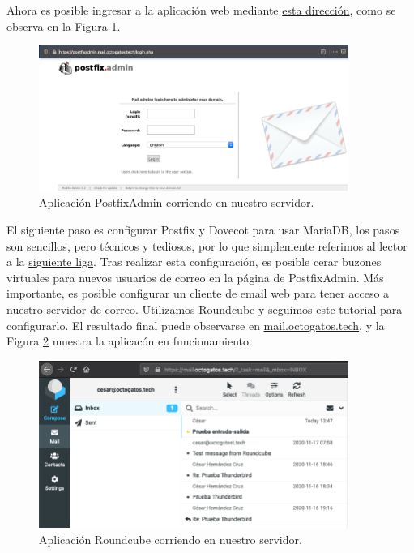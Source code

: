 \documentclass{article}
\begin{document}
Ahora es posible ingresar a la aplicaci\'on web
mediante
\href{https://postfixadmin.mail.octogatos.tech/login.php}{esta direcci\'on}, como se observa en la Figura
\ref{fig:email-postfixAdmin}.
\begin{figure}[H]
  \centering
  \includegraphics[width=0.9\textwidth]{email/postfixAdmin}
  \caption{Aplicaci\'on PostfixAdmin corriendo en nuestro
           servidor.}
  \label{fig:email-postfixAdmin}
\end{figure}

El siguiente paso es configurar Postfix y Dovecot para
usar MariaDB, los pasos son sencillos, pero t\'ecnicos y
tediosos, por lo que simplemente referimos al lector
a la \href{https://www.linuxbabe.com/mail-server/postfixadmin-create-virtual-mailboxes-ubuntu-20-04}{siguiente liga}.
Tras realizar esta configuraci\'on, es posible cerar
buzones virtuales para nuevos usuarios de correo en
la p\'agina de PostfixAdmin.   M\'as importante, es
posible configurar un cliente de email web para tener
acceso a nuestro servidor de correo.   Utilizamos
\href{https://roundcube.net/}{Roundcube} y seguimos
\href{https://www.linuxbabe.com/ubuntu/install-roundcube-webmail-ubuntu-20-04-apache-nginx}{este tutorial} para
configurarlo.  El resultado final puede observarse
en \href{https://mail.octogatos.tech}{mail.octogatos.tech},
y la Figura \ref{fig:email-roundcube} muestra la aplicac\'on
en funcionamiento.
\begin{figure}[H]
  \centering
  \includegraphics[width=0.9\textwidth]{email/roundcube}
  \caption{Aplicaci\'on Roundcube corriendo en nuestro
           servidor.}
  \label{fig:email-roundcube}
\end{figure}
\end{document}
